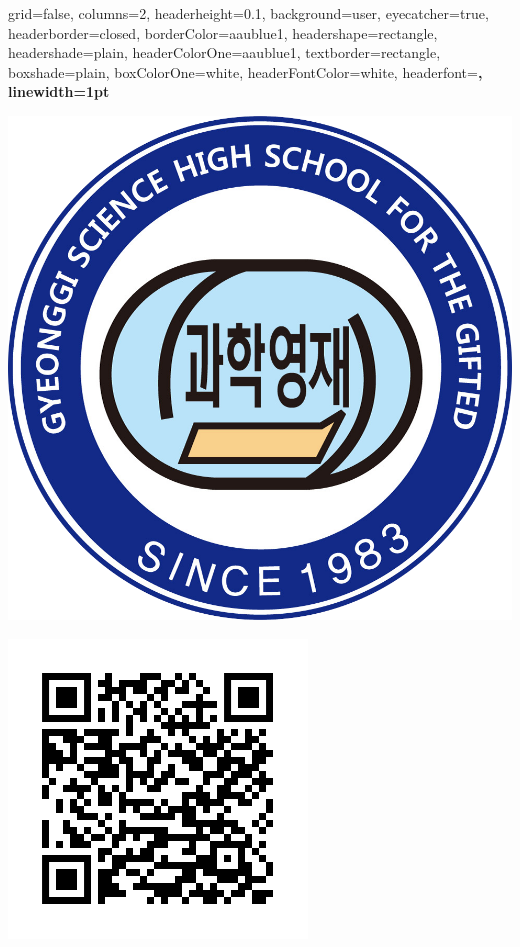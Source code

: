 \documentclass[a0paper,portrait]{baposter}
\begin{document}
\begin{poster}{
  grid=false,
  columns=2,
  headerheight=0.1\textheight,
  background=user,
  eyecatcher=true,
  headerborder=closed,
  borderColor=aaublue1,
  headershape=rectangle,
  headershade=plain,
  headerColorOne=aaublue1,
  textborder=rectangle,
  boxshade=plain,
  boxColorOne=white,
  headerFontColor=white,
  headerfont=\Large\sf\bf,
  linewidth=1pt
}
{

  \includegraphics[height=0.65\headerheight]{./logo/gshslogo.png}

  \includegraphics[height=0.65\headerheight]{./logo/frame.png}

}
\end{poster}
\end{document}
